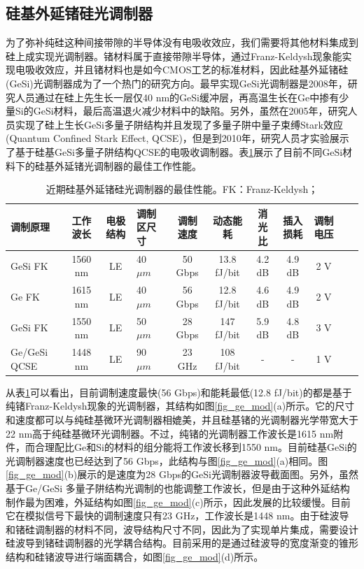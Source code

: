 \subsection{硅基外延锗硅光调制器}
为了弥补纯硅这种间接带隙的半导体没有电吸收效应，我们需要将其他材料集成到硅上成实现光调制器。锗材料属于直接带隙半导体，通过Franz-Keldysh现象能实现电吸收效应\cite{frova1965franz}，并且锗材料也是如今CMOS工艺的标准材料，因此硅基外延锗硅(GeSi)光调制器成为了一个热门的研究方向。最早实现GeSi光调制器是2008年\cite{liu2008waveguide}，研究人员通过在硅上先生长一层仅40 nm的GeSi缓冲层，再高温生长在Ge中掺有少量Si的GeSi材料，最后高温退火减少材料中的缺陷。另外，虽然在2005年，研究人员实现了硅上生长GeSi多量子阱结构并且发现了多量子阱中量子束缚Stark效应(Quantum Confined Stark Effect, QCSE)\cite{kuo2005strong}，但是到2010年，研究人员才实验展示了基于硅基GeSi多量子阱结构QCSE的电吸收调制器\cite{rong2010quantum}。表\ref{sil_ge_mod}展示了目前不同GeSi材料下的硅基外延锗光调制器的最佳工作性能。
{
	\begin{table}[htb]
		\caption{近期硅基外延锗硅光调制器的最佳性能。FK：Franz-Keldysh；}
		\label{sil_ge_mod}
		\centering
		\begin{tabular}[t]{p{1.5cm}ccp{1.2cm}ccccccc}
			\hline
			调制原理 & 工作波长 & 电极结构 & 调制区尺寸 & 调制速度 & 动态能耗 & 消光比 & 插入损耗 & 调制电压\\
			\hline
			GeSi FK\cite{srinivasan201650gb} & 1560 nm & LE & 40 $\mu m$ &  50 Gbps & 13.8 fJ/bit & 4.2 dB&4.9 dB&2 V\\
			Ge FK\cite{Srinivasan201656} & 1615 nm & LE  & 40 $\mu m$ & 56 Gbps & 12.8 fJ/bit & 4.6 dB & 4.9 dB& 2 V\\
			GeSi FK\cite{Dazeng2013high} & 1550 nm & LE  & 50 $\mu m$ & 28 Gbps & 147 fJ/bit & 5.9 dB & 4.8 dB& 3 V\\
			Ge/GeSi QCSE\cite{chaisakul201223} & 1448 nm & LE & 90 $\mu m$ & 23 GHz & 108 fJ/bit & - & - & 1 V\\
			\hline
		\end{tabular}
	\end{table}
}

从表\ref{sil_ge_mod}可以看出，目前调制速度最快(56 Gbps)和能耗最低(12.8 fJ/bit)的都是基于纯锗Franz-Keldysh现象的光调制器，其结构如图\ref{fig_ge_mod}(a)所示。它的尺寸和速度都可以与纯硅基微环光调制器相媲美，并且硅基锗的光调制器光学带宽大于22 nm高于纯硅基微环光调制器\cite{Srinivasan201656}。不过，纯锗的光调制器工作波长是1615 nm附件，而合理配比Ge和Si的材料的组分能将工作波长移到1550 nm。目前硅基GeSi的光调制器速度也已经达到了56 Gbps\cite{srinivasan201650gb}，此结构与图\ref{fig_ge_mod}(a)相同。图\ref{fig_ge_mod}(b)展示的是速度为28 Gbps的GeSi光调制器波导截面图。另外，虽然基于Ge/GeSi 多量子阱结构光调制的也能调整工作波长，但是由于这种外延结构制作最为困难，外延结构如图\ref{fig_ge_mod}(c)所示，因此发展的比较缓慢。目前它在模拟信号下最快的调制速度只有23 GHz，工作波长是1448 nm。由于硅波导和锗硅调制器的材料不同，波导结构尺寸不同，因此为了实现单片集成，需要设计硅波导到锗硅调制器的光学耦合结构。目前采用的是通过硅波导的宽度渐变的锥形结构和硅锗波导进行端面耦合，如图\ref{fig_ge_mod}(d)所示。

